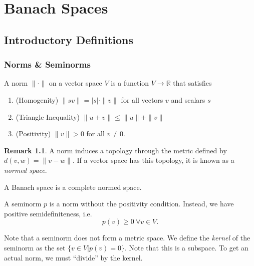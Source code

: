 \documentclass[twoside,symmetric, openany, 12pt]{./tuftebook}
\theoremstyle{definition}
\newtheorem{Remark}[Theorem]{Remark}
\theoremstyle{definition}
\theoremstyle{definition}
\newenvironment{parts}{\begin{enumerate}[label=(\alph*)]}{\end{enumerate}}
\newcommand{\R}{\mathbb{R}}
\begin{document}
	\chapter{Banach Spaces}
	\section{Introductory Definitions}
	\subsection{Norms \& Seminorms}
	\begin{Definition}[Norm]
		A norm $\|\cdot\|$ on a vector space $V$ is a function $V\to \R$ that satisfies
		\begin{parts}
			\item (Homogenity) $\|sv\|=|s|\cdot \|v\|$ for all vectors $v$ and scalars $s$
			\item (Triangle Inequality) $\|u+v\|\le \|u\| + \|v\|$
			\item (Positivity) $\|v\|>0$ for all $v\neq 0$.  
		\end{parts}
	\end{Definition}
	\begin{Remark}
		A norm induces a topology through the metric defined by $d(v, w)=\|v-w\|$. If a vector space has this topology, it is known as a \emph{normed space}.
	\end{Remark}
	\begin{Definition}
		A Banach space is a complete normed space.
\end{Definition}
	\begin{Definition}[Seminorm]
		A seminorm $p$ is a norm without the positivity condition. Instead, we have positive semidefiniteness, i.e.
		\[p(v)\ge 0~\forall v\in V.\]
	\end{Definition}
	Note that a seminorm does not form a metric space. We define the \emph{kernel} of the seminorm as the set $\{v\in V|p(v)=0\}$. Note that this is a subspace. To get an actual norm, we must ``divide'' by the kernel.
	
\end{document}

